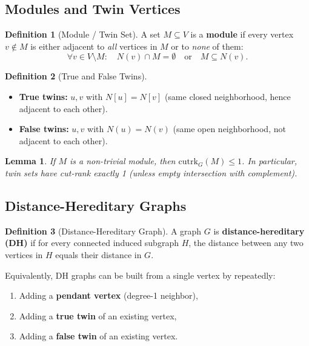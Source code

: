\documentclass[11pt,a4paper]{article}
\theoremstyle{definition}
\newtheorem{definition}{Definition}[section]
\theoremstyle{plain}
\newtheorem{lemma}{Lemma}[section]
\theoremstyle{remark}
\newcommand{\cutrk}{\mathrm{cutrk}}
\begin{document}
\subsection{Modules and Twin Vertices}

\begin{definition}[Module / Twin Set]
A set $M \subseteq V$ is a \textbf{module} if every vertex $v \notin M$
is either adjacent to \emph{all} vertices in $M$ or to \emph{none} of them:
\[
  \forall v \in V \setminus M: \quad
  N(v) \cap M = \emptyset \quad \text{or} \quad M \subseteq N(v).
\]
\end{definition}

\begin{definition}[True and False Twins]
\begin{itemize}
  \item \textbf{True twins:} $u, v$ with $N[u] = N[v]$ (same closed neighborhood,
        hence adjacent to each other).
  \item \textbf{False twins:} $u, v$ with $N(u) = N(v)$ (same open neighborhood,
        not adjacent to each other).
\end{itemize}
\end{definition}

\begin{lemma}
If $M$ is a non-trivial module, then $\cutrk_G(M) \leq 1$.
In particular, twin sets have cut-rank exactly 1 (unless empty intersection
with complement).
\end{lemma}

\subsection{Distance-Hereditary Graphs}

\begin{definition}[Distance-Hereditary Graph]
A graph $G$ is \textbf{distance-hereditary (DH)} if for every connected
induced subgraph $H$, the distance between any two vertices in $H$ equals
their distance in $G$.
\end{definition}

Equivalently, DH graphs can be built from a single vertex by repeatedly:
\begin{enumerate}
  \item Adding a \textbf{pendant vertex} (degree-1 neighbor),
  \item Adding a \textbf{true twin} of an existing vertex,
  \item Adding a \textbf{false twin} of an existing vertex.
\end{enumerate}
\end{document}
